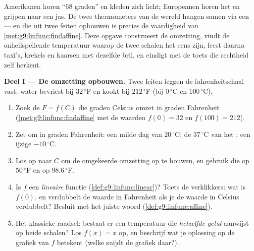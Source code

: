 \begin{problem}
\label{pb:g9:linfunc:1}
Amerikanen horen ``$68$ graden'' en kleden zich licht; Europeanen horen het en
grijpen naar een jas. De twee thermometers van de wereld hangen samen via een
 --- en die uit twee feiten opbouwen is precies de vaardigheid van
\cref{met:g9:linfunc:findaffine}. Deze opgave construeert de omzetting, vindt de
onheilspellende temperatuur waarop de twee schalen het eens zijn, leest daarna
taxi's, krekels en kaarsen met dezelfde bril, en eindigt met de toets die rechtheid
zelf herkent.

\medskip
\noindent\textbf{Deel I --- De omzetting opbouwen.}
Twee feiten leggen de fahrenheitschaal vast: water bevriest bij $32\,^\circ$F en
kookt bij $212\,^\circ$F (bij $0\,^\circ$C en $100\,^\circ$C).
\begin{enumerate}
  \item Zoek de  $F = f(C)$ die graden Celsius omzet in graden
        Fahrenheit (\cref{met:g9:linfunc:findaffine} met de waarden $f(0) = 32$ en
        $f(100) = 212$).
  \item Zet om in graden Fahrenheit: een milde dag van $20\,^\circ$C; de
        $37\,^\circ$C van het ; een ijzige $-10\,^\circ$C.
  \item Los op naar $C$ om de omgekeerde omzetting op te bouwen, en gebruik die op
        $50\,^\circ$F en op $98.6\,^\circ$F.
  \item Is $f$ een \emph{lineaire} functie (\cref{def:g9:linfunc:linear})? Toets de
        verklikkers: wat is $f(0)$, en verdubbelt de waarde in Fahrenheit als je de
        waarde in Celsius verdubbelt? Besluit met het juiste woord
        (\cref{def:g9:linfunc:affine}).
  \item Het klassieke raadsel: bestaat er een temperatuur die \emph{hetzelfde
        getal} aanwijst op beide schalen? Los $f(x) = x$ op, en beschrijf wat je
        oplossing op de grafiek van $f$ betekent (welke  snijdt de grafiek
        daar?).
\end{enumerate}


\end{problem}
